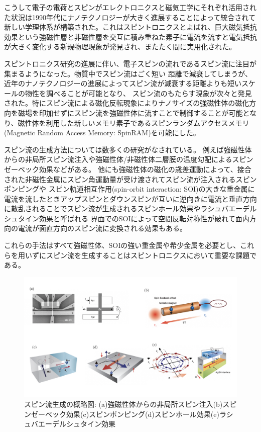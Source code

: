 \documentclass[dvipdfmx,11pt]{jsreport}
\numberwithin{equation}{chapter}
\numberwithin{table}{chapter}
\begin{document}
こうして電子の電荷とスピンがエレクトロニクスと磁気工学にそれぞれ活用された状況は1990年代にナノテクノロジーが大きく進展することによって統合されて新しい学理体系が構築された。これはスピントロニクスとよばれ、巨大磁気抵抗効果という強磁性層と非磁性層を交互に積み重ねた素子に電流を流すと電気抵抗が大きく変化する新規物理現象が発見され、またたく間に実用化された。

スピントロニクス研究の進展に伴い、電子スピンの流れであるスピン流に注目が集まるようになった。物質中でスピン流はごく短い
距離で減衰してしまうが、近年のナノテクノロジーの進展によってスピン流が減衰する距離よりも短いスケールの物性を調べることが可能となり、
スピン流のもたらす現象が次々と発見された。特にスピン流による磁化反転現象によりナノサイズの強磁性体の磁化方向を磁場を印加せずにスピン流を強磁性体に流すことで制御することが可能となり、磁性体を利用した新しいメモリ素子であるスピンランダムアクセスメモリ(Magnetic Random Access Memory: SpinRAM)を可能にした。

スピン流の生成方法については数多くの研究がなされている。
例えば強磁性体からの非局所スピン流注入や強磁性体/非磁性体二層膜の温度勾配によるスピンゼーベック効果などがある。
他にも強磁性体の磁化の歳差運動によって、接合された非磁性金属にスピン角運動量が受け渡されてスピン流が注入されるスピンポンピングや
スピン軌道相互作用(spin-orbit interaction: SOI)の大きな重金属に電流を流したときアップスピンとダウンスピンが互いに逆向きに電流と垂直方向に散乱されることでスピン流が生成されるスピンホール効果やラシュバエーデルシュタイン効果と呼ばれる
界面でのSOIによって空間反転対称性が破れて面内方向の電流が面直方向のスピン流に変換される効果もある。

これらの手法はすべて強磁性体、SOIの強い重金属や希少金属を必要とし、これらを用いずにスピン流を生成することはスピントロニクスにおいて重要な課題である。

\begin{figure}[H]
	\centering
	\includegraphics[width=\textwidth]{sefig/sefig.001.jpeg}
	\caption{スピン流生成の概略図: (a)強磁性体からの非局所スピン注入\cite{JedemaF.J2001Esia}(b)スピンゼーベック効果\cite{SaitohE2008Oots}(c)スピンポンピング\cite{AndoK2011Isei}(d)スピンホール効果\cite{AndoK2011Isei}(e)ラシュバエーデルシュタイン効果\cite{NomuraAkiyo2015Tdoi}}
	\label{fig:sefig-sefig-001-jpeg}
\end{figure}
\end{document}
